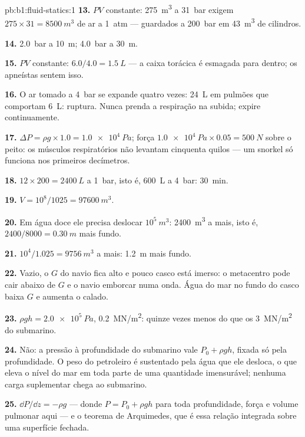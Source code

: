 \begin{solution}{pb:b1:fluid-statics:1}
\textbf{13.} $PV$ constante: \qty{275}{m^3} a \qty{31}{bar} exigem $275 \times 31
= \qty{8500}{m^3}$ de ar a \qty{1}{atm} --- guardados a \qty{200}{bar} em
\qty{43}{m^3} de cilindros.

\textbf{14.} \qty{2.0}{bar} a \qty{10}{m}; \qty{4.0}{bar} a \qty{30}{m}.

\textbf{15.} $PV$ constante: $6.0/4.0 = \qty{1.5}{L}$ --- a caixa torácica é
esmagada para dentro; os apneístas sentem isso.

\textbf{16.} O ar tomado a \qty{4}{bar} se expande quatro vezes: \qty{24}{L} em pulmões
que comportam \qty{6}{L}: ruptura. Nunca prenda a respiração na subida;
expire continuamente.

\textbf{17.} $\Delta P = \rho g \times 1.0 = \qty{1.0e4}{Pa}$; força $\qty{1.0e4}{Pa}
\times 0.05 = \qty{500}{N}$ sobre o peito: os músculos respiratórios não
levantam cinquenta quilos --- um snorkel só funciona nos primeiros decímetros.

\textbf{18.} $12 \times 200 = \qty{2400}{L}$ a \qty{1}{bar}, isto é, \qty{600}{L}
a \qty{4}{bar}: \qty{30}{min}.

\textbf{19.} $V = 10^8/1025 = \qty{97600}{m^3}$.

\textbf{20.} Em água doce ele precisa deslocar $10^5\ \unit{m^3}$: \qty{2400}{m^3}
a mais, isto é, $2400/8000 = \qty{0.30}{m}$ mais fundo.

\textbf{21.} $10^4/1.025 = \qty{9756}{m^3}$ a mais: \qty{1.2}{m} mais fundo.

\textbf{22.} Vazio, o $G$ do navio fica alto e pouco casco está imerso:
o metacentro pode cair abaixo de $G$ e o navio emborcar numa onda. Água do
mar no fundo do casco baixa $G$ e aumenta o calado.

\textbf{23.} $\rho gh = \qty{2.0e5}{Pa}$, \qty{0.2}{MN/m^2}: quinze vezes menos
do que os \qty{3}{MN/m^2} do submarino.

\textbf{24.} Não: a pressão à profundidade do submarino vale $P_0 + \rho gh$,
fixada só pela profundidade. O peso do petroleiro é sustentado pela água que
ele desloca, o que eleva o nível do mar em toda parte de uma quantidade
imensurável; nenhuma carga suplementar chega ao submarino.

\textbf{25.} $\dd P/\dd z = -\rho g$ --- donde $P = P_0 + \rho gh$ para toda
profundidade, força e volume pulmonar aqui --- e o teorema de Arquimedes, que é
essa relação integrada sobre uma superfície fechada.
\end{solution}
